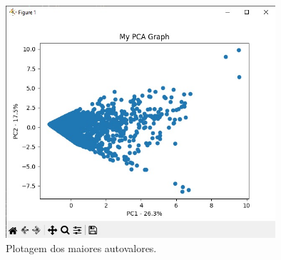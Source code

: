 \documentclass{article}
\begin{document}
\begin{figure}[!h]
\centering
\includegraphics[width=10cm]{coordenadas.jpg}
\caption{Plotagem dos maiores autovalores.}
\label{fig:coordenadas.jpg}
\end{figure}\\
\end{document}
